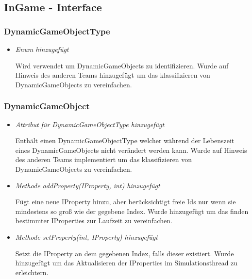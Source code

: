 \subsection{InGame - Interface}

\subsubsection{DynamicGameObjectType}
\begin{itemize}
    \item \textit{Enum hinzugefügt}
        \begin{leftbar}[0.9\linewidth]
            Wird verwendet um DynamicGameObjects zu identifizieren.
            Wurde auf Hinweis des anderen Teams hinzugefügt um das
            klassifizieren von DynamicGameObjects zu vereinfachen.
        \end{leftbar}
\end{itemize}

\subsubsection{DynamicGameObject}
\begin{itemize}
    \item \textit{Attribut für DynamicGameObjectType hinzugefügt}
        \begin{leftbar}[0.9\linewidth]
            Enthält einen DynamicGameObjectType welcher während der Lebenszeit eines DynamicGameObjects
            nicht verändert werden kann. Wurde auf Hinweis des anderen Teams implementiert um das
            klassifizieren von DynamicGameObjects zu vereinfachen.
        \end{leftbar}

    \item \textit{Methode addProperty(IProperty, int) hinzugefügt}
        \begin{leftbar}[0.9\linewidth]
            Fügt eine neue IProperty hinzu, aber berücksichtigt freie Ids nur wenn sie mindestens so groß
            wie der gegebene Index. Wurde hinzugefügt um das finden bestimmter IProperties zur Laufzeit
            zu vereinfachen.
        \end{leftbar}

    \item \textit{Methode setProperty(int, IProperty) hinzugefügt}
        \begin{leftbar}[0.9\linewidth]
            Setzt die IProperty an dem gegebenen Index, falls dieser existiert.
            Wurde hinzugefügt um das Aktualisieren der IProperties im Simulationsthread zu erleichtern.
        \end{leftbar}
\end{itemize}

